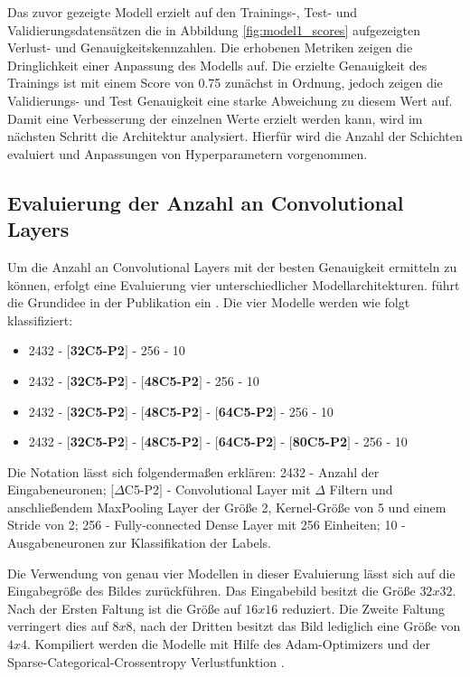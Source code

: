Das zuvor gezeigte Modell erzielt auf den Trainings-, Test- und Validierungsdatensätzen die in Abbildung \ref{fig:model1_scores} aufgezeigten Verlust- und Genauigkeitskennzahlen. Die erhobenen Metriken zeigen die Dringlichkeit einer Anpassung des Modells auf. Die erzielte Genauigkeit des Trainings ist mit einem Score von 0.75 zunächst in Ordnung, jedoch zeigen die Validierungs- und Test Genauigkeit eine starke Abweichung zu diesem Wert auf. Damit eine Verbesserung der einzelnen Werte erzielt werden kann, wird im nächsten Schritt die Architektur analysiert. Hierfür wird die Anzahl der Schichten evaluiert und Anpassungen von Hyperparametern vorgenommen. 

\subsection{Evaluierung der Anzahl an Convolutional Layers}
Um die Anzahl an Convolutional Layers mit der besten Genauigkeit ermitteln zu können, erfolgt eine Evaluierung vier unterschiedlicher Modellarchitekturen. \citeauthor{ChrisDeotte2018} führt die Grundidee in der Publikation  ein \cite{ChrisDeotte2018}.
Die vier Modelle werden wie folgt klassifiziert:
\begin{itemize}
	\item 2432 - \textbf{$[$32C5-P2$]$} - 256 - 10
	\item 2432 - \textbf{$[$32C5-P2$]$} - \textbf{$[$48C5-P2$]$} - 256 - 10
	\item 2432 - \textbf{$[$32C5-P2$]$} - \textbf{$[$48C5-P2$]$} - \textbf{$[$64C5-P2$]$} - 256 - 10
	\item 2432 - \textbf{$[$32C5-P2$]$} - \textbf{$[$48C5-P2$]$} - \textbf{$[$64C5-P2$]$} - \textbf{$[$80C5-P2$]$} - 256 - 10
\end{itemize}

Die Notation lässt sich folgendermaßen erklären: 2432 - Anzahl der Eingabeneuronen; $[\Delta$C5-P2$]$ - Convolutional Layer mit $\Delta$ Filtern und anschließendem MaxPooling Layer der Größe 2, Kernel-Größe von 5 und einem Stride von 2; 256 - Fully-connected Dense Layer mit 256 Einheiten; 10 - Ausgabeneuronen zur Klassifikation der Labels. 

Die Verwendung von genau vier Modellen in dieser Evaluierung lässt sich auf die Eingabegröße des Bildes zurückführen. Das Eingabebild besitzt die Größe $32x32$. Nach der Ersten Faltung ist die Größe auf $16x16$ reduziert. Die Zweite Faltung verringert dies auf $8x8$, nach der Dritten besitzt das Bild lediglich eine Größe von $4x4$. Kompiliert werden die Modelle mit Hilfe des \gls{Adam}-Optimizers \cite{kingma2017adam} und der Sparse-Categorical-Crossentropy Verlustfunktion \cite{scc-2021}.

